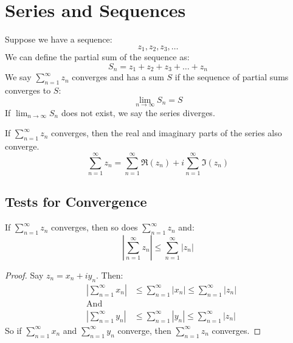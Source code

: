 \chapter{Series and Sequences}

\begin{definition}
    Suppose we have a sequence:
    \begin{equation}
        z_1, z_2, z_3, \ldots
    \end{equation}
    We can define the partial sum of the sequence as:
    \begin{equation}
        S_n = z_1 + z_2 + z_3 + \ldots + z_n
    \end{equation}
    We say $\sum_{n=1}^{\infty} z_n$ converges and has a sum $S$ if the sequence of partial sums converges to $S$:
    \begin{equation}
        \lim_{n \to \infty} S_n = S
    \end{equation}
    If $\lim_{n \to \infty} S_n$ does not exist, we say the series diverges.
\end{definition}

\begin{corollary}
    If $\sum_{n=1}^{\infty} z_n$ converges, then the real and imaginary parts of the series also converge.
    \begin{equation}
        \sum_{n=1}^{\infty} z_n = \sum_{n=1}^{\infty} \Re(z_n) + i \sum_{n=1}^{\infty} \Im(z_n)
    \end{equation}
\end{corollary}

\section{Tests for Convergence}
\begin{theorem}
    If $\sum_{n=1}^{\infty} z_n$ converges, then so does $\sum_{n=1}^{\infty} z_n$ and:
    \[
        \left| \sum_{n=1}^{\infty} z_n \right| \leq \sum_{n=1}^{\infty} |z_n|
    \]
\end{theorem}

\begin{proof}
    Say $z_n = x_n + i y_n$. Then:
    \begin{align}
         & \left| \sum_{n=1}^{\infty} x_n \right| & \leq \sum_{n=1}^{\infty}  \left| x_n \right| \leq \sum_{n=1}^{\infty}  \left| z_n \right| \\
         & \text{And}                                                                                                                         \\
         & \left| \sum_{n=1}^{\infty} y_n \right| & \leq \sum_{n=1}^{\infty}  \left| y_n \right| \leq \sum_{n=1}^{\infty}  \left| z_n \right|
    \end{align}
    So if $\sum_{n=1}^{\infty} x_n$ and $\sum_{n=1}^{\infty} y_n$ converge, then $\sum_{n=1}^{\infty} z_n$ converges.
\end{proof}

